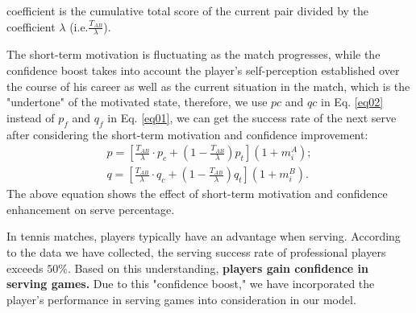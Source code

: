 \documentclass{mcmthesis}
\begin{document}
coefficient is the cumulative total score of the current pair divided by the coefficient $\lambda$ (i.e.$\frac{T_{AB}}{\lambda}$).\par
The short-term motivation is fluctuating as the match progresses, while the confidence boost
takes into account the player’s self-perception established over the course of his career as well
as the current situation in the match, which is the "undertone" of the motivated state, therefore,
we use $pc$ and $qc$ in Eq. \eqref{eq02} instead of $p_f$ and $q_f$ in Eq. \eqref{eq01}, we can get the success rate of the
next serve after considering the short-term motivation and confidence improvement:
\begin{equation*}
  \begin{split}
    p = \left[ \frac{T_{AB}}{\lambda} \cdot p_c + \left( 1 - \frac{T_{AB}}{\lambda} \right) p_t \right] (1 + m_i^A);\\
    q = \left[ \frac{T_{AB}}{\lambda} \cdot q_c + \left( 1 - \frac{T_{AB}}{\lambda} \right) q_t \right] (1 + m_i^B).
  \end{split}
\end{equation*}
The above equation shows the effect of short-term motivation and confidence enhancement
on serve percentage.\par
In tennis matches, players typically have an advantage when serving. According to the
data we have collected, the serving success rate of professional players exceeds $50\%$. Based
on this understanding, \textbf{players gain confidence in serving games.} Due to this "confidence
boost," we have incorporated the player’s performance in serving games into consideration in
our model.
\end{document}

